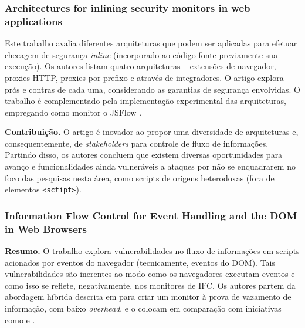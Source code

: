 \subsubsection{Architectures for inlining security monitors in web applications \cite{Magazinius2014}}
Este trabalho avalia diferentes arquiteturas que podem ser aplicadas para efetuar checagem de segurança \textit{inline} (incorporado ao código fonte previamente sua execução). Os autores listam quatro arquiteturas -- extensões de navegador, proxies HTTP, proxies por prefixo e através de integradores.
O artigo explora prós e contras de cada uma, considerando as garantias de segurança envolvidas. O trabalho é complementado pela implementação experimental das arquiteturas, empregando como monitor o JSFlow \cite{Hedin2014}.

\textbf{Contribuição.} O artigo é inovador ao propor uma diversidade de arquiteturas e, consequentemente, de \textit{stakeholders} para controle de fluxo de informações. Partindo disso, os autores concluem que existem diversas oportunidades para avanço e funcionalidades ainda vulneráveis a ataques por não se enquadrarem no foco das pesquisas nesta área, como scripts de origens heterodoxas (fora de elementos \texttt{<sctipt>}).


\subsubsection{Information Flow Control for Event Handling and the DOM in Web Browsers \cite{Rajani2015}}
\textbf{Resumo.} O trabalho explora vulnerabilidades no fluxo de informações em scripts acionados por eventos do navegador (tecnicamente, eventos do DOM). Tais vulnerabilidades são inerentes ao modo como os navegadores executam eventos e como isso se reflete, negativamente, nos monitores de IFC. Os autores partem da abordagem híbrida descrita em \cite{Bichhawat2014} para criar um monitor à prova de vazamento de informação, com baixo \textit{overhead}, e o colocam em comparação com iniciativas como \cite{Stefan2014} e \cite{Hedin2014}.
